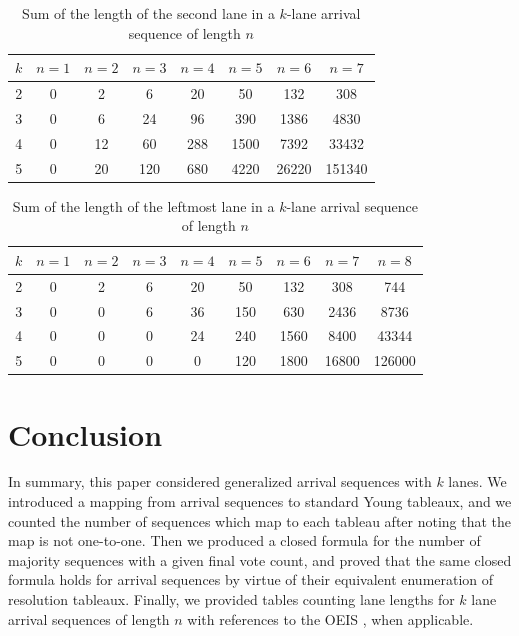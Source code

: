 \documentclass[article]{amsart}
\theoremstyle{plain}
\theoremstyle{definition}
\begin{document}
\begin{table}[h!]
    \centering
    \begin{tabular}{c|ccccccc}
     $k$ & $n=1$ & $n=2$ & $n=3$ & $n=4$ & $n=5$ & $n=6$ & $n=7$ \\
     \hline
     2 & 0 & 2 & 6 & 20 & 50 & 132 & 308 \\
     3 & 0 & 6 & 24 & 96 & 390 & 1386 & 4830 \\
     4 & 0 & 12 & 60 & 288 & 1500 & 7392 & 33432 \\
     5 & 0 & 20 & 120 & 680 & 4220 &  26220 & 151340 \\
    \end{tabular}
    \caption{Sum of the length of the second lane in a $k$-lane arrival sequence of length $n$ }
    \label{tab:2Kn}
\end{table}
\begin{table}[h!]
    \centering
    \begin{tabular}{c|cccccccc}
     $k$ & $n=1$ & $n=2$ & $n=3$ & $n=4$ & $n=5$ & $n=6$ & $n=7$ & $n=8$ \\
     \hline
     2 & 0 & 2 & 6 & 20 & 50 & 132 & 308 & 744  \\
     3 & 0 & 0 & 6 & 36 & 150 & 630 & 2436 & 8736  \\
     4 & 0 & 0 & 0 & 24 & 240 & 1560 & 8400 & 43344  \\
     5 & 0 & 0 & 0 & 0 & 120 & 1800 & 16800 & 126000 \\
    \end{tabular}
    \caption{Sum of the length of the leftmost lane in a $k$-lane arrival sequence of length $n$}
    \label{tab:LastKn}
\end{table}

\section{Conclusion} \label{sec:conc}

In summary, this paper considered generalized arrival sequences with $k$ lanes. We introduced a mapping from arrival sequences to standard Young tableaux, and we counted the number of sequences which map to each tableau after noting that the map is not one-to-one. Then we produced a closed formula for the number of majority sequences with a given final vote count, and proved that the same closed formula holds for arrival sequences by virtue of their equivalent enumeration of resolution tableaux. Finally, we provided tables counting lane lengths for $k$ lane arrival sequences of length $n$ with references to the OEIS \cite{oeis}, when applicable. 
\end{document}
